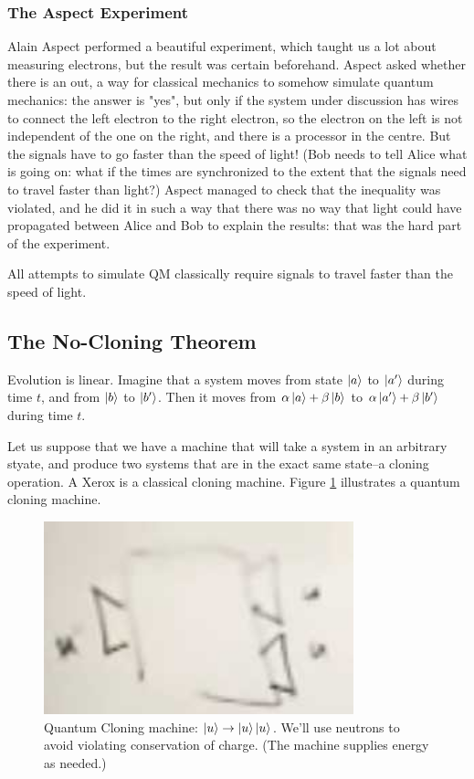 \documentclass[]{article}
\begin{document}
\subsubsection{The Aspect Experiment}
Alain Aspect performed  a beautiful experiment\cite{aspect1982experimental}, which taught us a lot about measuring electrons, but the result was certain beforehand. Aspect asked whether there is an out, a way for classical mechanics to somehow simulate quantum mechanics: the answer is "yes", but only if the system under discussion has wires to connect the left electron to the right electron, so the electron on the left is not independent of the one on the right, and there is a processor in the centre. But the signals have to go faster than the speed of light! (Bob needs to tell Alice what is going on: what if the times are synchronized to the extent that the signals need to travel faster than light?) Aspect managed to check that the inequality was violated, and he did it in such a way that there was no way that light could have propagated between Alice and Bob to explain the results: that was the hard part of the experiment.

All attempts to simulate QM classically require signals to travel faster than the speed of light.

\subsection{The No-Cloning Theorem}

Evolution is linear. Imagine that a system moves from state $\ket{a}$ to $\ket{a^{\prime}}$ during time $t$, and from  $\ket{b}$ to $\ket{b^{\prime}}$. Then it moves from $\alpha \ket{a} + \beta \ket{b}$ to $\alpha \ket{a^{\prime}} + \beta \ket{b^{\prime}}$ during time $t$.

Let us suppose that we have a machine that will take a system in an arbitrary styate, and produce two systems that are in the exact same state--a cloning operation. A Xerox is a classical cloning machine.  Figure \ref{fig:quantum:cloning:machine} illustrates a quantum cloning machine.

\begin{figure}[H]
	\caption[Quantum Cloning machine: $\ket{u}\rightarrow \ket{u}\ket{u}$]{Quantum Cloning machine: $\ket{u}\rightarrow \ket{u} \ket{u}$. We'll use neutrons to avoid violating conservation of charge. (The machine supplies energy as needed.)}\label{fig:quantum:cloning:machine}
	\includegraphics[width=0.8\textwidth]{quantum-cloning-machine}
\end{figure}
\end{document}
